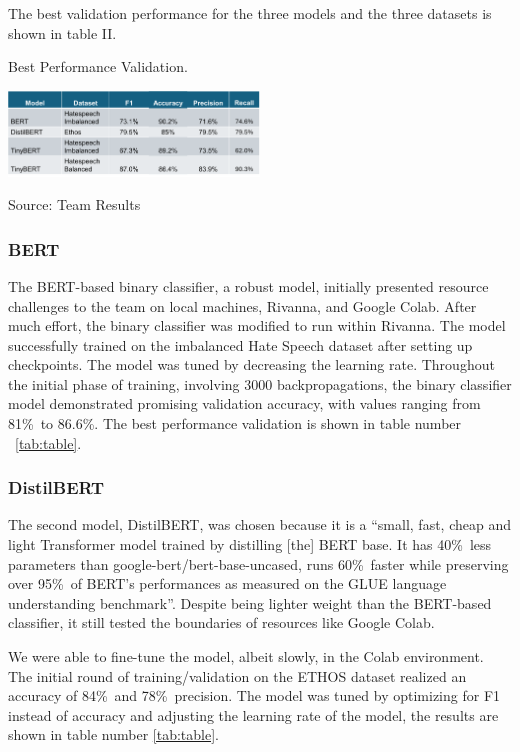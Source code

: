 \documentclass[conference]{IEEEtran}
\begin{document}
The best validation performance for the three models and the three datasets is shown in table II.

\begin{table}[h!]
  \caption{Best Performance Validation.}
  \label{tab:table}
  \centering\includegraphics[width=0.5\textwidth]{3.png}
  \caption*{Source: Team Results}
\end{table}

\subsubsection{BERT}
The BERT-based binary classifier, a robust model\cite{b14}, initially presented resource challenges to the team on local machines, Rivanna, and Google Colab. After much effort, the binary classifier was modified to run within Rivanna. The model successfully trained on the imbalanced Hate Speech dataset after setting up checkpoints\cite{b20}. The model was tuned by decreasing the learning rate. Throughout the initial phase of training, involving 3000 backpropagations, the binary classifier model demonstrated promising validation accuracy, with values ranging from 81\%\ to 86.6\%. The best performance validation is shown in table number ~\ref{tab:table}.

\subsubsection{DistilBERT}
The second model, DistilBERT, was chosen because it is a “small, fast, cheap and light Transformer model trained by distilling [the] BERT base. It has 40\%\ less parameters than google-bert/bert-base-uncased, runs 60\%\ faster while preserving over 95\%\ of BERT’s performances as measured on the GLUE language understanding benchmark”\cite{b16}. Despite being lighter weight than the BERT-based classifier, it still tested the boundaries of resources like Google Colab. 

We were able to fine-tune the model, albeit slowly, in the Colab environment. The initial round of training/validation on the ETHOS dataset realized an accuracy of 84\%\ and 78\%\ precision\cite{b21}. The model was tuned by optimizing for F1 instead of accuracy and adjusting the learning rate of the model, the results are shown in table number \ref{tab:table}.
\end{document}
